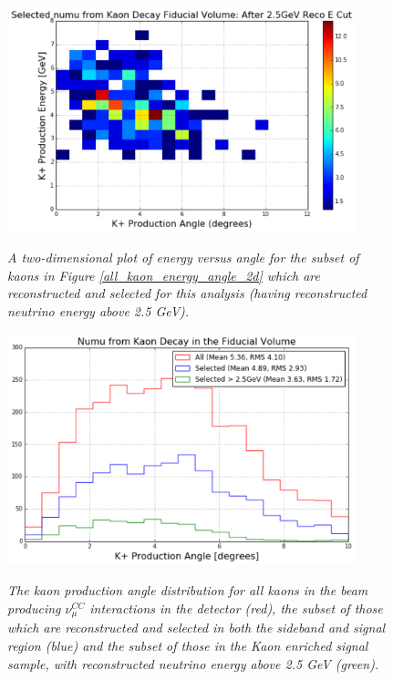 \begin{figure}[ht!]
\centering
	\includegraphics[width=0.9\textwidth]{Figures/selected_kaon_energy_angle_2d.png} \\
\caption{\textit{A two-dimensional plot of energy versus angle for the subset of kaons in Figure \ref{all_kaon_energy_angle_2d} which are reconstructed and selected for this analysis (having reconstructed neutrino energy above 2.5 GeV).}}\label{selected_kaon_energy_angle_2d}
\end{figure}


\begin{figure}[ht!]
\centering
	\includegraphics[width=0.9\textwidth]{Figures/kaon_angle_selection.png} \\
\caption{\textit{The kaon production angle distribution for all kaons in the beam producing $\nu_\mu^{CC}$ interactions in the detector (red), the subset of those which are reconstructed and selected in both the sideband and signal region (blue) and the subset of those in the Kaon enriched signal sample, with reconstructed neutrino energy above 2.5 GeV (green).}}\label{kaon_angle_selection}
\end{figure}


